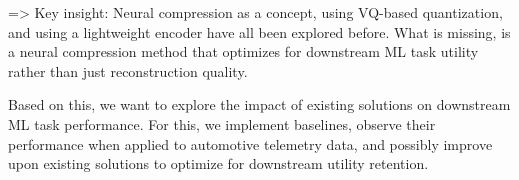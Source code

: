 => Key insight: Neural compression as a concept, using VQ-based quantization, and using a lightweight encoder have all been explored before. What is missing, is a neural compression method that optimizes for downstream ML task utility rather than just reconstruction quality.

Based on this, we want to explore the impact of existing solutions on downstream ML task performance. For this, we implement baselines, observe their performance when applied to automotive telemetry data, and possibly improve upon existing solutions to optimize for downstream utility retention. 
